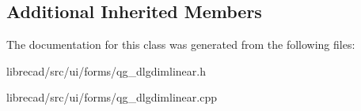 \subsection*{Additional Inherited Members}


The documentation for this class was generated from the following files\-:\begin{DoxyCompactItemize}
\item 
librecad/src/ui/forms/qg\-\_\-dlgdimlinear.\-h\item 
librecad/src/ui/forms/qg\-\_\-dlgdimlinear.\-cpp\end{DoxyCompactItemize}
